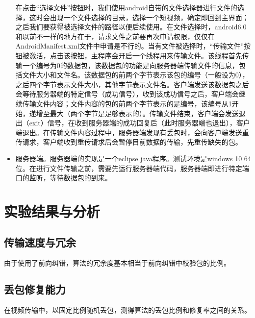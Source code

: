 \documentclass[onecolumn]{article}
\begin{document}
\begin{CJK*}{UTF8}{gbsn}
\begin{itemize}
			
			在点击“选择文件”按钮时，我们使用android自带的文件选择器进行文件的选择，这时会出现一个文件选择的目录，选择一个短视频，确定即回到主界面；之后我们要获得被选择文件的路径以便后续使用。在文件选择时，android6.0和以前不一样的地方在于，请求文件之前要再次申请权限，仅仅在AndroidManifest.xml文件中申请是不行的。当有文件被选择时，“传输文件”按钮被激活，点击该按钮，主程序会开启一个线程用来传输文件。该线程首先传输一个编号为0的数据包，该数据包的功能是向服务器端传输文件的信息，包括文件大小和文件名。该数据包的前两个字节表示该包的编号（一般设为0），之后四个字节表示文件大小，其他字节表示文件名。客户端发送该数据包之后会等待服务器端的特定信号（成功信号），收到该成功信号之后，客户端会继续传输文件内容；文件内容的包的前两个字节表示的是编号，该编号从1开始，递增至最大（两个字节是足够表示的）。传输文件结束，客户端会发送退出（exit）信号，在收到服务器端的成功回复后（此时服务器端也退出），客户端退出。在传输文件内容过程中，服务器端发现有丢包时，会向客户端发送重传请求，客户端收到重传请求后会暂停目前数据的传输，先重传缺失的包。
			
			\item 服务器端。服务器端的实现是一个eclipse java程序。测试环境是windows 10 64位。在进行文件传输之前，需要先运行服务器端代码，服务器端即进行特定端口的监听，等待数据包的到来。 
		\end{itemize}
		
		\section{实验结果与分析}
		\subsection{传输速度与冗余}
		由于使用了前向纠错，算法的冗余度基本相当于前向纠错中校验包的比例。
		\subsection{丢包修复能力}
		在视频传输中，以固定比例随机丢包，测得算法的丢包比例和修复率之间的关系。
	\end{CJK*}
	
\end{document}
